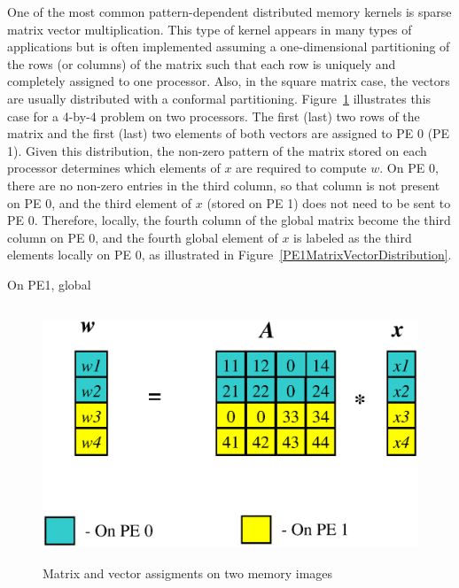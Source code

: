 \documentclass[12pt,relax]{PetraObjectModel}
\begin{document}
One of the most common pattern-dependent distributed memory 
kernels is sparse matrix vector multiplication.
This type of kernel appears in many types of applications but 
is often implemented assuming a
one-dimensional partitioning of the rows (or columns) of the 
matrix such that each row is uniquely and
completely assigned to one processor.  Also, in the square 
matrix case, the vectors are usually distributed
with a conformal partitioning.  Figure~\ref{MatrixVectorDistribution} 
illustrates this case for a 4-by-4
problem on two processors.  The first (last) two rows of 
the matrix and the first (last) two elements of 
both vectors are assigned to PE 0 (PE 1).  Given this 
distribution, the non-zero pattern of the matrix stored
on each processor determines which elements of $x$ are 
required to compute $w$.  On PE 0, there are no
non-zero entries in the third column, so that column is 
not present on PE 0, and the third element of $x$
(stored on PE 1) does not need to be sent to PE 0.  
Therefore, locally, the fourth
column of the global matrix become the third column on 
PE 0, and the fourth global element of $x$ is labeled
as the third elements locally on PE 0, as illustrated 
in Figure~\ref{PE1MatrixVectorDistribution}.

On PE1, global

\begin{figure} 
\begin{center} 
\includegraphics[height=3in]{TwoPESpMV}
\end{center} 
\label{MatrixVectorDistribution}
\caption{Matrix and vector assigments on two memory images}
\end{figure} 
\end{document}
